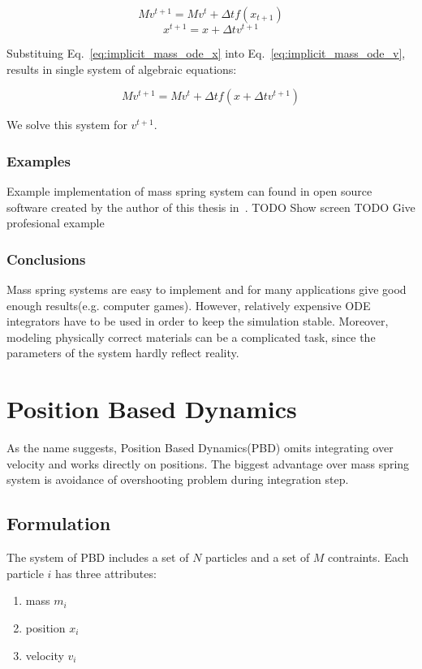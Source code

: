 \documentclass[en]{minipw} %
\begin{document}
\begin{equation}
\label{eq:implicit_mass_ode_v}
M v^{t+1} = M v^{t} + \Delta t f(x_{t+1})
\end{equation}
\begin{equation}
\label{eq:implicit_mass_ode_x}
x^{t+1} = x + \Delta t v^{t+1}
\end{equation}

Substituing Eq.~\ref{eq:implicit_mass_ode_x} into Eq.~\ref{eq:implicit_mass_ode_v}, results in single system of algebraic equations:

\begin{equation}
M v^{t+1} = M v^{t} + \Delta t f(x + \Delta t v^{t+1})
\end{equation}

We solve this system for $v^{t+1}$.

\subsubsection{Examples}
Example implementation of mass spring system can found in open source software created by the author of this thesis in~\cite{JC-MassSpring}. 
TODO Show screen
TODO Give profesional example

\subsubsection{Conclusions}
Mass spring systems are easy to implement and for many applications give good enough results(e.g. computer games). However, relatively expensive ODE integrators have to be used in order to keep the simulation stable. Moreover, modeling physically correct materials can be a complicated task, since the parameters of the system hardly reflect reality.

\section{Position Based Dynamics}
As the name suggests, Position Based Dynamics(PBD) omits integrating over velocity and works directly on positions. The biggest advantage over mass spring system is avoidance of overshooting problem during integration step.
\subsection{Formulation}
The system of PBD includes a set of $N$ particles and a set of $M$ contraints. Each particle $i$ has three attributes: 
\begin{enumerate}
\item mass $m_i$
\item position $x_i$
\item velocity $v_i$
\end{enumerate}
\end{document}
